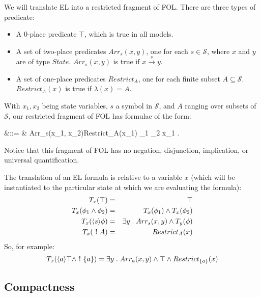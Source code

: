 We will translate EL into a restricted fragment of FOL.
There are three types of predicate:
\begin{itemize}
\item
A 0-place predicate $\top$, which is true in all models.
\item
A set of two-place predicates $Arr_s(x, y)$, one for each $s \in \mathcal{S}$, where $x$ and $y$ are of type $State$. $Arr_s(x, y)$ is true if $x \xrightarrow{s} y$.
\item
A set of one-place predicates $Restrict_A$, one for each finite subset $A \subseteq \mathcal{S}$. 
$Restrict_{A}(x)$ is true if $\lambda(x) = A$.
\end{itemize}
With $x_1, x_2$ being state variables, $s$ a symbol in $\mathcal{S}$, and $A$ ranging over subsets of $\mathcal{S}$, our restricted fragment of FOL has formulae of the form:
\begin{GRAMMAR}
  \phi 
     &\quad ::= \quad&
  \top \fOr Arr_{s}(x_1, x_2)\fOr Restrict_A(x_1) \fOr \phi_1 \AND \phi_2 \fOr \exists x_1 . \phi 
\end{GRAMMAR}
Notice that this fragment of FOL has no negation, disjunction, implication, or universal quantification.

The translation of an EL formula is relative to a variable $x$ (which will be instantiated to the particular state at which we are evaluating the formula):
\begin{eqnarray*}
T_x(\top) & = & \top  \\
T_x(\phi_1 \land \phi_2) & = & T_x(\phi_1) \land T_x(\phi_2)  \\
T_x(\langle s \rangle \phi) & = & \exists y \; . \; Arr_s(x,y) \land T_y(\phi)  \\
T_x(\ ! \  A) & = & Restrict_A(x) 
\end{eqnarray*}
So, for example:
\[
T_x(\langle a \rangle \top \land \ ! \  \{a\}) = \exists y \; . \; Arr_a(x,y) \land \top \land Restrict_{\{a\}}(x)
\]


\subsection{Compactness}

